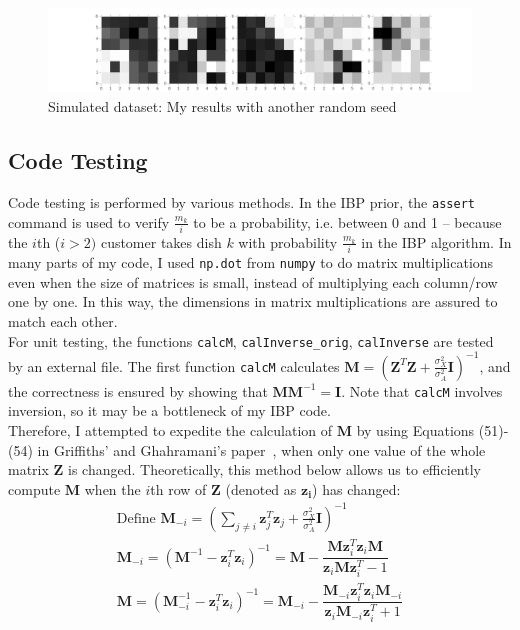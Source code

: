 \begin{figure}[!ht]
\centering
    \includegraphics[width=\linewidth]{IBP_image_results_K5.png}
    \caption{Simulated dataset: My results with another random seed}
    \label{fig:imageresultsK5}
\end{figure}

\subsection{Code Testing}

Code testing is performed by various methods. In the IBP prior, the \texttt{assert} command is used to verify $\frac{m_k}{i}$ to be a probability, i.e. between 0 and 1 -- because the $i$th ($i > 2)$ customer takes dish $k$ with probability $\frac{m_k}{i}$ in the IBP algorithm. In many parts of my code, I used \texttt{np.dot} from \texttt{numpy} to do matrix multiplications even when the size of matrices is small, instead of multiplying each column/row one by one. In this way, the dimensions in matrix multiplications are assured to match each other.\\

For unit testing, the functions \texttt{calcM}, \texttt{calInverse\_orig}, \texttt{calInverse} are tested by an external file. The first function \texttt{calcM} calculates $\mathbf{M} = (\mathbf{Z}^T\mathbf{Z}+\frac{\sigma_X^2}{\sigma_A^2}\mathbf{I})^{-1}$, and the correctness is ensured by showing that $\mathbf{M}\mathbf{M}^{-1} = \mathbf{I}$. Note that \texttt{calcM} involves inversion, so it may be a bottleneck of my IBP code.\\

Therefore, I attempted to expedite the calculation of $\mathbf{M}$ by using Equations (51)-(54) in Griffiths' and Ghahramani's paper~\cite{griffiths2005detailed}, when only one value of the whole matrix $\textbf{Z}$ is changed. Theoretically, this method below allows us to efficiently compute $\mathbf{M}$ when the $i$th row of $\mathbf{Z}$ (denoted as $\mathbf{z_i}$) has changed:
\begin{gather}
\text{Define } \mathbf{M}_{-i} = (\sum_{j \neq i}\mathbf{z}^T_j \mathbf{z}_j + \frac{\sigma_X^2}{\sigma_A^2}\mathbf{I})^{-1} \\
\mathbf{M}_{-i} = (\mathbf{M}^{-1} - \mathbf{z}^T_i \mathbf{z}_i)^{-1} 
= \mathbf{M} - \dfrac{\mathbf{M}\mathbf{z}^T_i \mathbf{z}_i\mathbf{M}}{\mathbf{z}_i\mathbf{M}\mathbf{z}^T_i - 1} \\
\mathbf{M} = (\mathbf{M}_{-i}^{-1} - \mathbf{z}^T_i \mathbf{z}_i)^{-1} 
= \mathbf{M}_{-i} - \dfrac{\mathbf{M}_{-i}\mathbf{z}^T_i \mathbf{z}_i\mathbf{M}_{-i}}{\mathbf{z}_i\mathbf{M}_{-i}\mathbf{z}^T_i + 1}
\end{gather}

